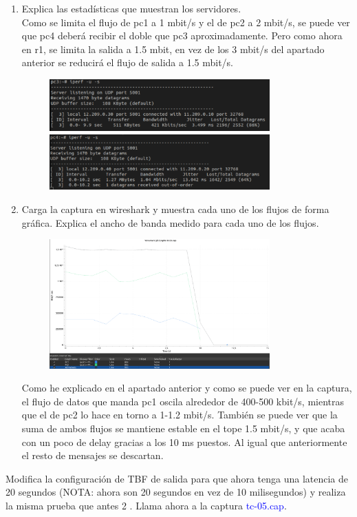 \documentclass[12pt, a4paper]{report}
\begin{document}
\begin{enumerate}
	\item Explica las estadísticas que muestran los servidores.\\
	
	Como se limita el flujo de pc1 a 1 mbit/s y el de pc2 a 2 mbit/s, se puede ver que pc4 deberá recibir el doble que pc3 aproximadamente. Pero como ahora en r1, se limita la salida a 1.5 mbit, en vez de los 3 mbit/s del apartado anterior se reducirá el flujo de salida a 1.5 mbit/s.
	\begin{figure}[H]
		\centering
		\includegraphics[width=0.8\textwidth]{ej1.3.1_1_a}
		\includegraphics[width=0.8\textwidth]{ej1.3.1_1_b}
	\end{figure}
	\item Carga la captura en wireshark y muestra cada uno de los flujos de forma gráfica. Explica el
	ancho de banda medido para cada uno de los flujos.
	\begin{figure}[H]
		\centering
		\includegraphics[width=0.8\textwidth]{ej1.3.1_2}
	\end{figure}
	Como he explicado en el apartado anterior y como se puede ver en la captura, el flujo de datos que manda pc1 oscila alrededor de 400-500 kbit/s, mientras que el de pc2 lo hace en torno a 1-1.2 mbit/s. También se puede ver que la suma de ambos flujos se mantiene estable en el tope 1.5 mbit/s, y que acaba con un poco de delay gracias a los 10 ms puestos. Al igual que anteriormente el resto de mensajes se descartan. 
\end{enumerate}
Modifica la configuración de TBF de salida para que ahora tenga una latencia de 20 segundos
(NOTA: ahora son 20 segundos en vez de 10 milisegundos) y realiza la misma prueba que antes 2 .
Llama ahora a la captura \textcolor{blue}{tc-05.cap}.\\
\end{document}
